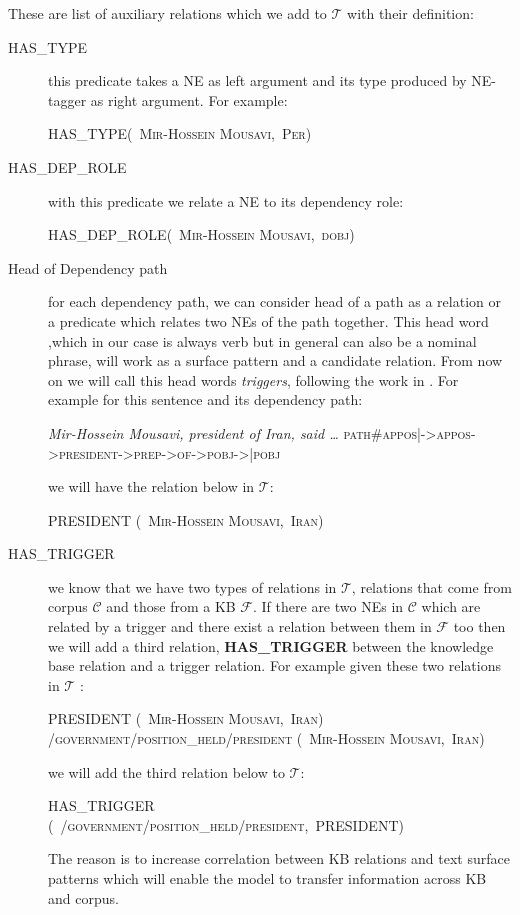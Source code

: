 These are list of auxiliary relations which we add to $\mathcal{T}$ with their
definition:
\begin {description}
\item[HAS\_TYPE] this predicate takes a NE as left argument and its type
produced by NE-tagger as right argument. For example:
\begin{center}
 \textsc{HAS\_TYPE(~Mir-Hossein Mousavi,~Per)}
 \end{center}

\item[HAS\_DEP\_ROLE] with this predicate we relate a NE to its dependency role:

\begin{center}
 \textsc{ HAS\_DEP\_ROLE(~Mir-Hossein Mousavi,~dobj)}
 \end{center}
 
 \item[Head of Dependency path] for each dependency path, we can consider 
 head of a path as a relation or a predicate which relates two NEs of the path
 together. This head word ,which in our case is always verb but in general can
 also be a nominal phrase, will work as a surface pattern and a candidate
 relation. From now on we will call this head words \textit{triggers},
 following the work in \cite{UniversalSchema}.
 For example for this sentence and its dependency path:
\begin{center}
 \textit{Mir-Hossein Mousavi, president of Iran, said \ldots}
 \textsc{path\#appos|->appos->president->prep->of->pobj->|pobj }
 \end{center}
 
 we will have the relation below in $\mathcal{T}$:
 \begin{center}
 \textsc{PRESIDENT (~Mir-Hossein Mousavi,~Iran)}
 \end{center}
 


\item[HAS\_TRIGGER] we know that we have two types of relations in
$\mathcal{T}$, relations that come from corpus $\mathcal{C}$ and those from a KB
$\mathcal{F}$. If there are two NEs in $\mathcal{C}$ which are related by a
trigger and there exist a relation between them in $\mathcal{F}$ too then we
will add a third relation, \textbf{HAS_TRIGGER} between the knowledge base
relation and a trigger relation. For example given these two relations in
$\mathcal{T}$ :
\begin{center}
 \textsc{PRESIDENT (~Mir-Hossein Mousavi,~Iran)}
 \textsc{ /government/position\_held/president (~Mir-Hossein Mousavi,~Iran)}
 \end{center}
 
 we will add the third relation below to $\mathcal{T}$:
  \begin{center}
 \textsc{HAS\_TRIGGER (~/government/position_held/president,~PRESIDENT)}
 \end{center}
 
 The reason is to increase correlation between KB relations and text surface
 patterns which will enable the model to transfer information across KB and
 corpus.
 \end{description}
 

